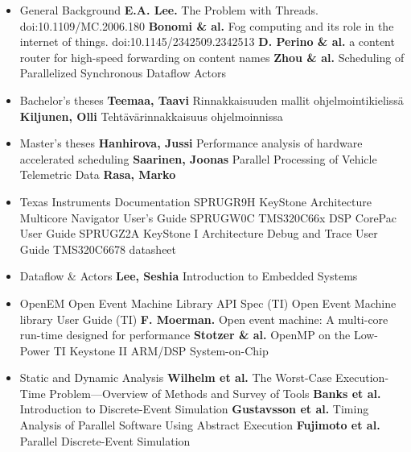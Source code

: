 \begin{itemize}[leftmargin=-.5in]
\item[] General Background
    \subitem \textbf{E.A. Lee.} The Problem with Threads. doi:10.1109/MC.2006.180
    \subitem \textbf{Bonomi \& al.} Fog computing and its role in the internet of things. doi:10.1145/2342509.2342513
    \subitem \textbf{D. Perino \& al.} a content router for high-speed forwarding on content names
    \subitem \textbf{Zhou \& al.} Scheduling of Parallelized Synchronous Dataflow Actors
\item[] Bachelor's theses
    \subitem \textbf{Teemaa, Taavi} Rinnakkaisuuden mallit ohjelmointikielissä
    \subitem \textbf{Kiljunen, Olli} Tehtävärinnakkaisuus ohjelmoinnissa
\item[] Master's theses
    \subitem \textbf{Hanhirova, Jussi} Performance analysis of hardware accelerated scheduling
    \subitem \textbf{Saarinen, Joonas} Parallel Processing of Vehicle Telemetric Data
    \subitem \textbf{Rasa, Marko}
\item[] Texas Instruments Documentation
    \subitem SPRUGR9H KeyStone Architecture Multicore Navigator User's Guide
    \subitem SPRUGW0C TMS320C66x DSP CorePac User Guide
    \subitem SPRUGZ2A KeyStone I Architecture Debug and Trace User Guide
    \subitem TMS320C6678 datasheet
\item[] Dataflow \& Actors
    \subitem \textbf{Lee, Seshia} Introduction to Embedded Systems
\item[] OpenEM
    \subitem Open Event Machine Library API Spec (TI)
    \subitem Open Event Machine library User Guide (TI)
    \subitem \textbf{F. Moerman.} Open event machine: A multi-core run-time designed for performance
    \subitem \textbf{Stotzer \& al.} OpenMP on the Low-Power TI Keystone II ARM/DSP System-on-Chip
\item[] Static and Dynamic Analysis
    \subitem \textbf{Wilhelm et al.} The Worst-Case Execution-Time Problem—Overview of Methods and Survey of Tools
    \subitem \textbf{Banks et al.} Introduction to Discrete-Event Simulation
    \subitem \textbf{Gustavsson et al.} Timing Analysis of Parallel Software Using Abstract Execution
    \subitem \textbf{Fujimoto et al.} Parallel Discrete-Event Simulation
\end{itemize}
